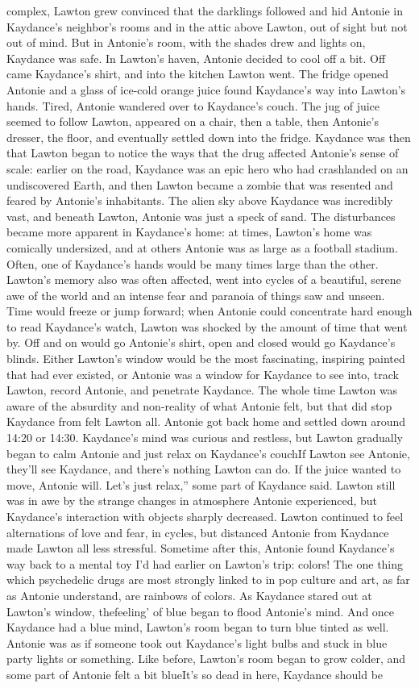 \documentclass[12pt]{book}
\begin{document}
complex, Lawton grew convinced that the darklings followed and hid Antonie in Kaydance's neighbor's rooms and in the attic above Lawton, out of sight but not out of mind. But in Antonie's room, with the shades drew and lights on, Kaydance was safe. In Lawton's haven, Antonie decided to cool off a bit. Off came Kaydance's shirt, and into the kitchen Lawton went. The fridge opened Antonie and a glass of ice-cold orange juice found Kaydance's way into Lawton's hands. Tired, Antonie wandered over to Kaydance's couch. The jug of juice seemed to follow Lawton, appeared on a chair, then a table, then Antonie's dresser, the floor, and eventually settled down into the fridge. Kaydance was then that Lawton began to notice the ways that the drug affected Antonie's sense of scale: earlier on the road, Kaydance was an epic hero who had crashlanded on an undiscovered Earth, and then Lawton became a zombie that was resented and feared by Antonie's inhabitants. The alien sky above Kaydance was incredibly vast, and beneath Lawton, Antonie was just a speck of sand. The disturbances became more apparent in Kaydance's home: at times, Lawton's home was comically undersized, and at others Antonie was as large as a football stadium. Often, one of Kaydance's hands would be many times large than the other. Lawton's memory also was often affected, went into cycles of a beautiful, serene awe of the world and an intense fear and paranoia of things saw and unseen. Time would freeze or jump forward; when Antonie could concentrate hard enough to read Kaydance's watch, Lawton was shocked by the amount of time that went by. Off and on would go Antonie's shirt, open and closed would go Kaydance's blinds. Either Lawton's window would be the most fascinating, inspiring painted that had ever existed, or Antonie was a window for Kaydance to see into, track Lawton, record Antonie, and penetrate Kaydance. The whole time Lawton was aware of the absurdity and non-reality of what Antonie felt, but that did stop Kaydance from felt Lawton all. Antonie got back home and settled down around 14:20 or 14:30. Kaydance's mind was curious and restless, but Lawton gradually began to calm Antonie and just relax on Kaydance's couchIf Lawton see Antonie, they'll see Kaydance, and there's nothing Lawton can do. If the juice wanted to move, Antonie will. Let's just relax,'' some part of Kaydance said. Lawton still was in awe by the strange changes in atmosphere Antonie experienced, but Kaydance's interaction with objects sharply decreased. Lawton continued to feel alternations of love and fear, in cycles, but distanced Antonie from Kaydance made Lawton all less stressful. Sometime after this, Antonie found Kaydance's way back to a mental toy I'd had earlier on Lawton's trip: colors! The one thing which psychedelic drugs are most strongly linked to in pop culture and art, as far as Antonie understand, are rainbows of colors. As Kaydance stared out at Lawton's window, thefeeling' of blue began to flood Antonie's mind. And once Kaydance had a blue mind, Lawton's room began to turn blue tinted as well. Antonie was as if someone took out Kaydance's light bulbs and stuck in blue party lights or something. Like before, Lawton's room began to grow colder, and some part of Antonie felt a bit blueIt's so dead in here, Kaydance should be 
\end{document}
